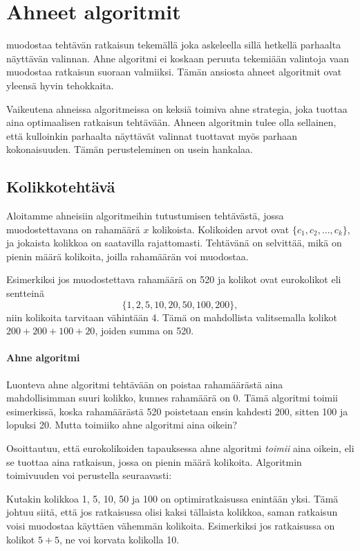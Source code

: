 \chapter{Ahneet algoritmit}


muodostaa tehtävän ratkaisun
tekemällä joka askeleella
sillä hetkellä parhaalta näyttävän valinnan.
Ahne algoritmi ei koskaan 
peruuta tekemiään valintoja vaan
muodostaa ratkaisun suoraan valmiiksi.
Tämän ansiosta ahneet algoritmit ovat
yleensä hyvin tehokkaita.

Vaikeutena ahneissa algoritmeissa on
keksiä toimiva ahne strategia,
joka tuottaa aina optimaalisen ratkaisun tehtävään.
Ahneen algoritmin tulee olla sellainen,
että kulloinkin parhaalta näyttävät valinnat
tuottavat myös parhaan kokonaisuuden.
Tämän perusteleminen on usein hankalaa.

\section{Kolikkotehtävä}

Aloitamme ahneisiin algoritmeihin tutustumisen
tehtävästä, jossa muodostettavana on
rahamäärä $x$ kolikoista.
Kolikoiden arvot ovat $\{c_1,c_2,\ldots,c_k\}$,
ja jokaista kolikkoa on saatavilla rajattomasti.
Tehtävänä on selvittää, mikä on pienin määrä
kolikoita, joilla rahamäärän voi muodostaa.

Esimerkiksi jos muodostettava
rahamäärä on 520
ja kolikot ovat eurokolikot eli sentteinä
\[\{1,2,5,10,20,50,100,200\},\]
niin kolikoita tarvitaan vähintään 4.
Tämä on mahdollista valitsemalla kolikot
$200+200+100+20$, joiden summa on 520.

\subsubsection{Ahne algoritmi}

Luonteva ahne algoritmi tehtävään
on poistaa rahamäärästä aina mahdollisimman
suuri kolikko, kunnes rahamäärä on 0.
Tämä algoritmi toimii esimerkissä,
koska rahamäärästä 520 
poistetaan ensin kahdesti 200, sitten 100
ja lopuksi 20.
Mutta toimiiko ahne algoritmi aina oikein?

Osoittautuu, että eurokolikoiden tapauksessa
ahne algoritmi \emph{toimii} aina oikein,
eli se tuottaa aina ratkaisun,
jossa on pienin määrä kolikoita.
Algoritmin toimivuuden voi perustella
seuraavasti:

Kutakin kolikkoa 1, 5, 10, 50 ja 100
on optimiratkaisussa enintään yksi.
Tämä johtuu siitä, että jos
ratkaisussa olisi kaksi tällaista kolikkoa,
saman ratkaisun voisi muodostaa
käyttäen vähemmän kolikoita.
Esimerkiksi jos ratkaisussa on
kolikot $5+5$, ne voi korvata kolikolla 10.

